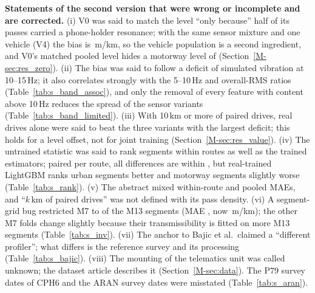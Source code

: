 \documentclass[onecolumn,10pt]{IEEEtran}
\begin{document}
\textbf{Statements of the second version that were wrong or incomplete and are corrected.}
(i) V0 was said to match the level ``only because'' half of its passes carried a phone-holder resonance; with the same sensor mixture and one vehicle (V4) the bias is \vvVfourBias\,m/km, so the vehicle population is a second ingredient, and V0's matched pooled level hides a motorway level of \ldVzeroMotorway{} (Section~\ref{M-sec:res_zero}).
(ii) The bias was said to follow a deficit of simulated vibration at 10--15\,Hz; it also correlates strongly with the 5--10\,Hz and overall-RMS ratios (Table~\ref{tab:s_band_assoc}), and only the removal of every feature with content above 10\,Hz reduces the spread of the sensor variants (Table~\ref{tab:s_band_limited}).
(iii) With 10\,km or more of paired drives, real drives alone were said to beat the three variants with the largest deficit; this holds for a level offset, not for joint training (Section~\ref{M-sec:res_value}).
(iv) The untrained statistic was said to rank segments within routes as well as the trained estimators; paired per route, all differences are within \rpAbsMax, but real-trained LightGBM ranks urban segments better and motorway segments slightly worse (Table~\ref{tab:s_rank}).
(v) The abstract mixed within-route and pooled MAEs, and ``$k$\,km of paired drives'' was not defined with its pass density.
(vi) A segment-grid bug restricted M7 to \mtMwThirteenOldSeg{} of the \mtMwThirteenNewSeg{} M13 segments (MAE \mtMwThirteenOldMae, now \mtMwThirteenNewMae\,m/km); the other M7 folds change slightly because their transmissibility is fitted on more M13 segments (Table~\ref{tab:s_inv}).
(vii) The anchor to Bajic et al.\ claimed a ``different profiler''; what differs is the reference survey and its processing (Table~\ref{tab:s_bajic}).
(viii) The mounting of the telematics unit was called unknown; the dataset article describes it (Section~\ref{M-sec:data}). The P79 survey dates of CPH6 and the ARAN survey dates were misstated (Table~\ref{tab:s_aran}).
\end{document}

